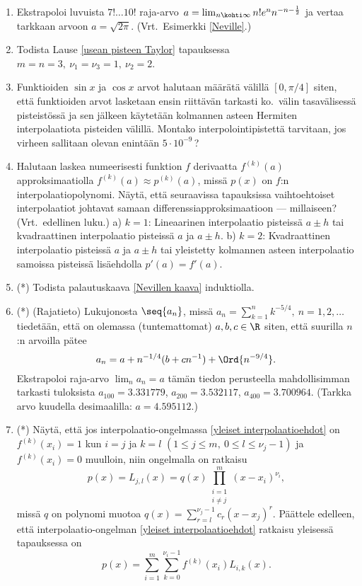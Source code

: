 \begin{enumerate}
\item
Ekstrapoloi luvuista $7! \ldots 10!$ raja-arvo $\,a=\lim_{n\kohti\infty} n!e^nn^{-n-\frac{1}{2}}$
ja vertaa tarkkaan arvoon $a=\sqrt{2\pi}$. (Vrt.\ Esimerkki \ref{Neville}.)

\item 
Todista Lause \ref{usean pisteen Taylor} tapauksessa $m=n=3,\ \nu_1=\nu_3=1,\ \nu_2=2$.

\item
Funktioiden $\sin x$ ja $\cos x$ arvot halutaan määrätä välillä $[0,\pi/4]$ siten, että
funktioiden arvot lasketaan ensin riittävän tarkasti ko.\ välin tasavälisessä pisteistössä ja
sen jälkeen käytetään kolmannen asteen Hermiten interpolaatiota pisteiden välillä. Montako
interpolointipistettä tarvitaan, jos virheen sallitaan olevan enintään $5 \cdot 10^{-9}$\,?

\pagebreak

\item \label{H-dif-6: interpolaatiot ja differessikaavat}
Halutaan laskea numeerisesti funktion $f$ derivaatta $f^{(k)}(a)$ approksimaatiolla
$f^{(k)}(a) \approx p^{(k)}(a)$, missä $p(x)$ on $f$:n interpolaatiopolynomi. Näytä, että
seuraavissa tapauksissa vaihtoehtoiset interpolaatiot johtavat samaan
differenssiapproksimaatioon --- millaiseen? (Vrt.\ edellinen luku.) \vspace{1mm}\newline
a) $k=1$: Lineaarinen interpolaatio pisteissä $a \pm h$ tai kvadraattinen interpolaatio
pisteissä $a$ ja $a \pm h$. \newline
b) $k=2$: Kvadraattinen interpolaatio pisteissä $a$ ja $a \pm h$ tai yleistetty kolmannen
asteen interpolaatio samoissa pisteissä lisäehdolla $p'(a)=f'(a)$. 

\item (*) \label{H-dif-6: Nevillen kaava}
Todista palautuskaava \eqref{Nevillen kaava} induktiolla.

\item (*) 
(Rajatieto) Lukujonosta $\seq{a_n}$, missä $a_n = \sum_{k=1}^n k^{-5/4},\ n=1,2, \ldots\,$
tiedetään, että on olemassa (tuntemattomat) $a,b,c\in\R$ siten, että suurilla $n$:n arvoilla
pätee
\[
a_n=a+n^{-1/4}(b+c n^{-1})+\Ord{n^{-9/4}}. 
\]
Ekstrapoloi raja-arvo $\lim_n a_n=a$ tämän tiedon perusteella mahdollisimman tarkasti tuloksista
$a_{100}=3.331779$, $a_{200}=3.532117$, $a_{400}=3.700964$. (Tarkka arvo kuudella
desimaalilla: $a=4.595112$.)

\item (*)  \label{H-dif-6: yleinen interpolaatio-ongelma}
Näytä, että jos interpolaatio-ongelmassa \eqref{yleiset interpolaatioehdot} on
$f^{(k)}(x_i)=1$ kun $i=j$ ja $k=l$ $(1 \le j \le m,\ 0 \le l \le \nu_j-1)$ ja
$f^{(k)}(x_i)=0$ muulloin, niin ongelmalla on ratkaisu
\[
p(x) = L_{j,l}(x) = q(x) \prod_{\substack{i=1 \\ i \neq j}}^m (x-x_i)^{\nu_i},
\]
missä $q$ on polynomi muotoa $q(x)=\sum_{r=l}^{\nu_j-1} c_r (x-x_j)^r$. Päättele edelleen, että
interpolaatio-ongelman \eqref{yleiset interpolaatioehdot} ratkaisu yleisessä tapauksessa on
\[
p(x) = \sum_{i=1}^m \sum_{k=0}^{\nu_i-1} f^{(k)}(x_i) L_{i,k}(x).
\] 

\end{enumerate}
